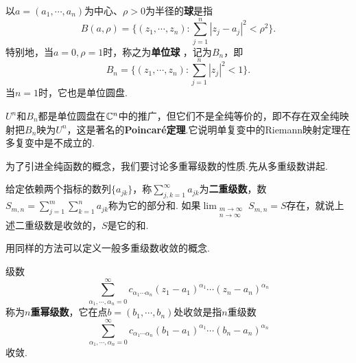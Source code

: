 以$a=(a_1,\cdots,a_n)$为中心、$\rho>0$为半径的\textbf{球}是指
\[B(a,\rho)=\bigg\{(z_1,\cdots,z_n):\sum_{j=1}^n|z_j-a_j|^2<\rho^2\bigg\}.\]
特别地，当$a=0,\rho=1$时，称之为\textbf{单位球}
，记为$B_n$，即
\[B_n=\bigg\{(z_1,\cdots,z_n):\sum_{j=1}^n|z_j|^2<1\bigg\}.\]
当$n=1$时，它也是单位圆盘.

$U^n$和$B_n$都是单位圆盘在$\mathbb C^n$中的推广，但它们不是全纯等价的，即不存在双全纯映射把$B_n$映为$U^n$，这是著名的\textbf{Poincar\'e定理}.它说明单复变中的Riemann映射定理在多复变中是不成立的.

为了引进全纯函数的概念，我们要讨论多重幂级数的性质.先从多重级数讲起.

给定依赖两个指标的数列$\{a_{jk}\}$，称$\sum_{j,k=1}^\infty a_{jk}$为\textbf{二重级数}，数$S_{m,n}=\sum_{j=1}^m\sum_{k=1}^n a_{jk}$称为它的部分和. 如果$\lim_{\substack{m\to\infty\\n\to\infty}}S_{m,n}=S$存在，就说上述二重级数是收敛的，$S$是它的和.

用同样的方法可以定义一般多重级数收敛的概念.

级数
\[\sum_{\alpha_1,\cdots,\alpha_n=0}^\infty c_{\alpha_1\cdots\alpha_n}(z_1-a_1)
^{\alpha_1}\cdots(z_n-a_n)^{\alpha_n}\]
称为\textbf{$n$重幂级数}，它在点$b=(b_1,\cdots,b_n)$处收敛是指$n$重级数
\[\sum_{\alpha_1,\cdots,\alpha_n=0}^\infty c_{\alpha_1\cdots\alpha_n}(b_1-a_1)
^{\alpha_1}\cdots(b_n-a_n)^{\alpha_n}\]
收敛.

